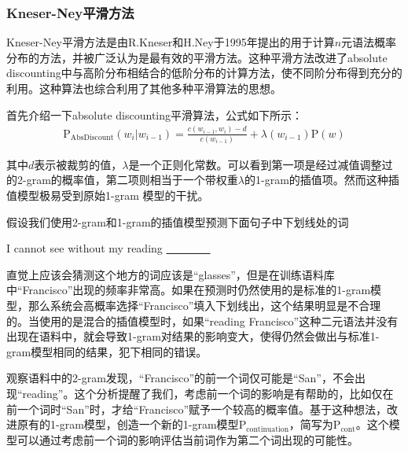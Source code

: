 
\subsubsection{Kneser-Ney平滑方法}

\parinterval Kneser-Ney平滑方法是由R.Kneser和H.Ney于1995年提出的用于计算$n$元语法概率分布的方法\cite{kneser1995improved}\cite{chen1999empirical}，并被广泛认为是最有效的平滑方法。这种平滑方法改进了absolute discounting中与高阶分布相结合的低阶分布的计算方法，使不同阶分布得到充分的利用。这种算法也综合利用了其他多种平滑算法的思想。

\parinterval 首先介绍一下absolute discounting平滑算法，公式如下所示：
\begin{eqnarray}
\textrm{P}_{\textrm{AbsDiscount}}(w_i | w_{i-1}) = \frac{c(w_{i-1},w_i )-d}{c(w_{i-1})} + \lambda(w_{i-1})\textrm{P}(w)
\label{eq:2-33}
\end{eqnarray}

\noindent 其中$d$表示被裁剪的值，$\lambda$是一个正则化常数。可以看到第一项是经过减值调整过的2-gram的概率值，第二项则相当于一个带权重$\lambda$的1-gram的插值项。然而这种插值模型极易受到原始1-gram 模型的干扰。

\parinterval 假设我们使用2-gram和1-gram的插值模型预测下面句子中下划线处的词

\vspace{0.0em}
\begin{center}
I cannot see without my reading \underline{\ \ \ \ \ \ \ \ }
\end{center}
\vspace{0.0em}

\noindent 直觉上应该会猜测这个地方的词应该是``glasses''，但是在训练语料库中``Francisco''出现的频率非常高。如果在预测时仍然使用的是标准的1-gram模型，那么系统会高概率选择``Francisco''填入下划线出，这个结果明显是不合理的。当使用的是混合的插值模型时，如果``reading Francisco''这种二元语法并没有出现在语料中，就会导致1-gram对结果的影响变大，使得仍然会做出与标准1-gram模型相同的结果，犯下相同的错误。

\parinterval 观察语料中的2-gram发现，``Francisco''的前一个词仅可能是``San''，不会出现``reading''。这个分析提醒了我们，考虑前一个词的影响是有帮助的，比如仅在前一个词时``San''时，才给``Francisco''赋予一个较高的概率值。基于这种想法，改进原有的1-gram模型，创造一个新的1-gram模型$\textrm{P}_{\textrm{continuation}}$，简写为$\textrm{P}_{\textrm{cont}}$。这个模型可以通过考虑前一个词的影响评估当前词作为第二个词出现的可能性。

